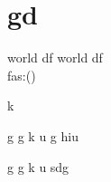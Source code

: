 \documentclass{article}
\begin{document}
\section{gd}
	world df \textbf{\gitRel}
	world df \textbf{\gitRel}\\
	fas:\gitRoff(\gitCommitterDate)\\
	\begin{changelog}[author=Michele]
		\begin{version}[version=1.20]
			\added
			\item k
		\end{version}
		
		\begin{version}[version=\gitReln]
			\added
			\item  g g k u g  hiu
		\end{version}
		
		\begin{version}[version=\gitReln]
			\added
			\item  g g k u sdg
		\end{version}
	\end{changelog}
\end{document}
